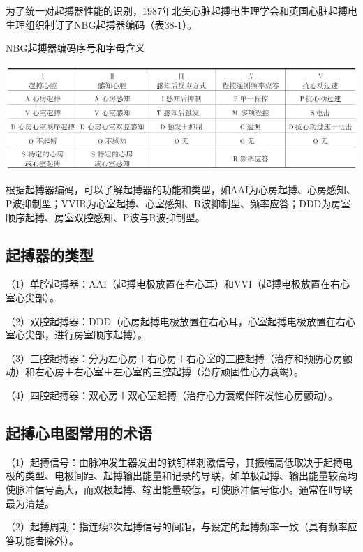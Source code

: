 为了统一对起搏器性能的识别，1987年北美心脏起搏电生理学会和英国心脏起搏电生理组织制订了NBG起搏器编码（表38-1）。

\begin{table}[htbp]
\centering
\caption{NBG起搏器编码序号和字母含义}
\label{tab38-1}
\includegraphics[width=5.45833in,height=1.57292in]{./images/Image00603.jpg}
\end{table}

根据起搏器编码，可以了解起搏器的功能和类型，如AAI为心房起搏、心房感知、P波抑制型；VVIR为心室起搏、心室感知、R波抑制型、频率应答；DDD为房室顺序起搏、房室双腔感知、P波与R波抑制型。

\protect\hypertarget{text00045.htmlux5cux23subid489}{}{}

\subsection{起搏器的类型}

（1）单腔起搏器：AAI（起搏电极放置在右心耳）和VVI（起搏电极放置在右心室心尖部）。

（2）双腔起搏器：DDD（心房起搏电极放置在右心耳，心室起搏电极放置在右心室心尖部，进行房室顺序起搏）。

（3）三腔起搏器：分为左心房＋右心房＋右心室的三腔起搏（治疗和预防心房颤动）和右心房＋右心室＋左心室的三腔起搏（治疗顽固性心力衰竭）。

（4）四腔起搏器：双心房＋双心室起搏（治疗心力衰竭伴阵发性心房颤动）。

\protect\hypertarget{text00045.htmlux5cux23subid490}{}{}

\subsection{起搏心电图常用的术语}

（1）起搏信号：由脉冲发生器发出的铁钉样刺激信号，其振幅高低取决于起搏电极的类型、电极间距、起搏输出能量和记录的导联，如单极起搏、输出能量较高均使脉冲信号高大，而双极起搏、输出能量较低，可使脉冲信号低小。通常在Ⅱ导联最为清楚。

（2）起搏周期：指连续2次起搏信号的间距，与设定的起搏频率一致（具有频率应答功能者除外）。

